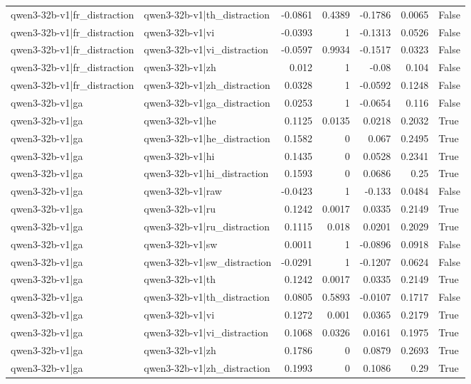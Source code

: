 \begin{table}
\begin{tabular}{l l r r r r l}
qwen3-32b-v1|fr_distraction & qwen3-32b-v1|th_distraction & -0.0861 & 0.4389 & -0.1786 & 0.0065 & False \\
qwen3-32b-v1|fr_distraction & qwen3-32b-v1|vi & -0.0393 & 1 & -0.1313 & 0.0526 & False \\
qwen3-32b-v1|fr_distraction & qwen3-32b-v1|vi_distraction & -0.0597 & 0.9934 & -0.1517 & 0.0323 & False \\
qwen3-32b-v1|fr_distraction & qwen3-32b-v1|zh & 0.012 & 1 & -0.08 & 0.104 & False \\
qwen3-32b-v1|fr_distraction & qwen3-32b-v1|zh_distraction & 0.0328 & 1 & -0.0592 & 0.1248 & False \\
qwen3-32b-v1|ga & qwen3-32b-v1|ga_distraction & 0.0253 & 1 & -0.0654 & 0.116 & False \\
qwen3-32b-v1|ga & qwen3-32b-v1|he & 0.1125 & 0.0135 & 0.0218 & 0.2032 & True \\
qwen3-32b-v1|ga & qwen3-32b-v1|he_distraction & 0.1582 & 0 & 0.067 & 0.2495 & True \\
qwen3-32b-v1|ga & qwen3-32b-v1|hi & 0.1435 & 0 & 0.0528 & 0.2341 & True \\
qwen3-32b-v1|ga & qwen3-32b-v1|hi_distraction & 0.1593 & 0 & 0.0686 & 0.25 & True \\
qwen3-32b-v1|ga & qwen3-32b-v1|raw & -0.0423 & 1 & -0.133 & 0.0484 & False \\
qwen3-32b-v1|ga & qwen3-32b-v1|ru & 0.1242 & 0.0017 & 0.0335 & 0.2149 & True \\
qwen3-32b-v1|ga & qwen3-32b-v1|ru_distraction & 0.1115 & 0.018 & 0.0201 & 0.2029 & True \\
qwen3-32b-v1|ga & qwen3-32b-v1|sw & 0.0011 & 1 & -0.0896 & 0.0918 & False \\
qwen3-32b-v1|ga & qwen3-32b-v1|sw_distraction & -0.0291 & 1 & -0.1207 & 0.0624 & False \\
qwen3-32b-v1|ga & qwen3-32b-v1|th & 0.1242 & 0.0017 & 0.0335 & 0.2149 & True \\
qwen3-32b-v1|ga & qwen3-32b-v1|th_distraction & 0.0805 & 0.5893 & -0.0107 & 0.1717 & False \\
qwen3-32b-v1|ga & qwen3-32b-v1|vi & 0.1272 & 0.001 & 0.0365 & 0.2179 & True \\
qwen3-32b-v1|ga & qwen3-32b-v1|vi_distraction & 0.1068 & 0.0326 & 0.0161 & 0.1975 & True \\
qwen3-32b-v1|ga & qwen3-32b-v1|zh & 0.1786 & 0 & 0.0879 & 0.2693 & True \\
qwen3-32b-v1|ga & qwen3-32b-v1|zh_distraction & 0.1993 & 0 & 0.1086 & 0.29 & True \\

\end{tabular}
\end{table}
